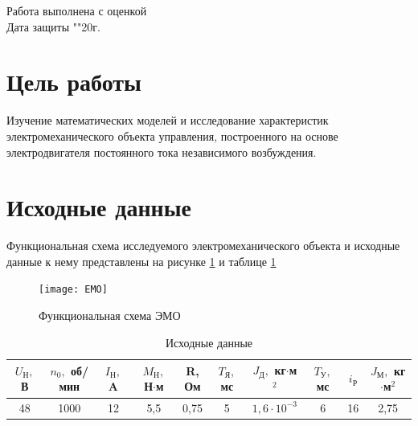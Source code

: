 \documentclass[a4paper, 12pt]{article}
\begin{document}
\begin{titlepage}
		Работа выполнена с оценкой \hspace{0.5cm} \underline{\hspace{10cm}} \\ 
		\vspace{1cm}
		Дата защиты "\underline{\hspace{0.4cm}}"\hspace{0.1cm}\underline{\hspace{1.5cm}}\hspace{0.1cm}20\underline{\hspace{0.4cm}}г.
		
		\end{titlepage}


\section*{Цель работы}
	Изучение математических моделей и исследование характеристик электромеханического объекта управления, построенного на основе электродвигателя постоянного тока независимого возбуждения.
\section*{Исходные данные}
Функциональная схема исследуемого электромеханического объекта и исходные данные к нему представлены на рисунке \ref{EMO} и таблице \ref{tab:dateTab}
	\begin{figure}[h!]
		\centering
		\texttt{[image: EMO]}
		\caption{Функциональная схема ЭМО}
		\label{EMO}
	\end{figure}

\begin{table}[h!]
	\centering
	\begin{threeparttable}
		\caption{Исходные данные}
		\begin{tabular}{|c|c|c|c|c|c|c|c|c|c|}
			\hline
			\makecell{$U_\text{Н},$\\В} & \makecell{$n_0,$\\об/мин} & \makecell{$I_\text{Н},$\\A} & \makecell{$M_\text{Н},$\\Н$\cdot$м} & \makecell{R,\\Ом} & \makecell{$T_\text{Я},$\\мс} & \makecell{$J_\text{Д},$\\кг$\cdot$м$^2$} & \makecell{$T_\text{У},$\\мс} &
			$i_\text{Р}$
			& \makecell{$J_\text{М},$\\кг$\cdot$м$^2$} \\
			\hline
			48 & 1000 & 12 & 5,5 & 0,75 & 5 & $1,6\cdot10^{-3}$ & 6 & 16 & 2,75\\
			\hline
		\end{tabular}
		\label{tab:dateTab}
	\end{threeparttable}
\end{table}
\end{document}
